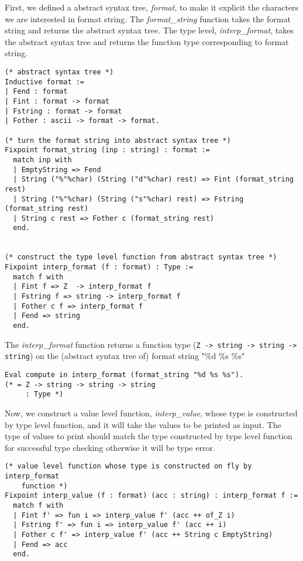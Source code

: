 First, we defined a abstract syntax tree, \textit{format}, to make it explicit the characters we 
are interested in format string. The \textit{format\_string} function takes the format string 
and returns the abstract syntax tree. The type level, \textit{interp\_format}, takes the 
abstract syntax tree and returns the function type corresponding to format string.

\begin{verbatim}
(* abstract syntax tree *)
Inductive format :=
| Fend : format
| Fint : format -> format
| Fstring : format -> format
| Fother : ascii -> format -> format.

(* turn the format string into abstract syntax tree *)
Fixpoint format_string (inp : string) : format :=
  match inp with
  | EmptyString => Fend
  | String ("%"%char) (String ("d"%char) rest) => Fint (format_string rest)
  | String ("%"%char) (String ("s"%char) rest) => Fstring (format_string rest)
  | String c rest => Fother c (format_string rest)
  end.


(* construct the type level function from abstract syntax tree *)
Fixpoint interp_format (f : format) : Type :=
  match f with
  | Fint f => Z  -> interp_format f
  | Fstring f => string -> interp_format f
  | Fother c f => interp_format f
  | Fend => string
  end.
\end{verbatim}


\noindent
The \textit{interp\_format} function returns a function type 
(\texttt{Z -> string -> string -> string})  on the (abstract syntax tree of) 
format string "\%d \%s \%s" 

\begin{verbatim}
Eval compute in interp_format (format_string "%d %s %s").
(* = Z -> string -> string -> string
     : Type *)
\end{verbatim}

Now, we construct a value level function, \textit{interp\_value}, whose type 
is constructed by type level function, and it will take the values to be printed as input.
The type of values to print should match the type constructed by type level 
function for successful type checking otherwise it will be type error. 

\begin{verbatim}
(* value level function whose type is constructed on fly by interp_format 
    function *)
Fixpoint interp_value (f : format) (acc : string) : interp_format f :=
  match f with
  | Fint f' => fun i => interp_value f' (acc ++ of_Z i)
  | Fstring f' => fun i => interp_value f' (acc ++ i)
  | Fother c f' => interp_value f' (acc ++ String c EmptyString)
  | Fend => acc
  end.
\end{verbatim}


